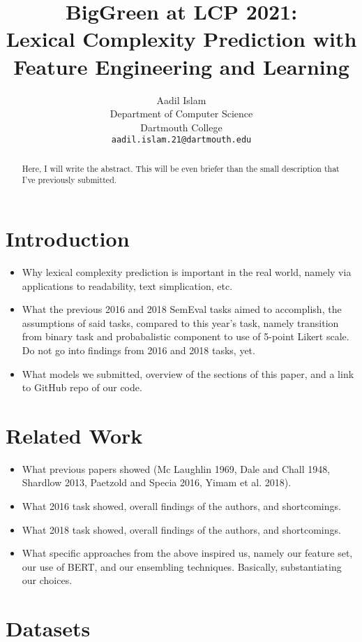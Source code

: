 \documentclass[11pt,a4paper]{article}
\title{BigGreen at LCP 2021: \\
Lexical Complexity Prediction with Feature Engineering and Learning}
\author{
  Aadil Islam\\
  Department of Computer Science\\
  Dartmouth College\\
  \texttt{aadil.islam.21@dartmouth.edu}
}
\date{}
\begin{document}
\maketitle
\begin{abstract}
  Here, I will write the abstract. This will be even briefer than the small description that I've previously submitted.
\end{abstract}

\section{Introduction}

\begin{itemize}
  \item Why lexical complexity prediction is important in the real world, namely via applications to readability, text simplication, etc.
  \item What the previous 2016 and 2018 SemEval tasks aimed to accomplish, the assumptions of said tasks, compared to this year's task, namely transition from binary task and probabalistic component to use of 5-point Likert scale. Do not go into findings from 2016 and 2018 tasks, yet.
  \item What models we submitted, overview of the sections of this paper, and a link to GitHub repo of our code.
\end{itemize}

\section{Related Work}

\begin{itemize}
  \item What previous papers showed (Mc Laughlin 1969, Dale and Chall 1948, Shardlow 2013, Paetzold and Specia 2016, Yimam et al. 2018).
  \item What 2016 task showed, overall findings of the authors, and shortcomings. 
  \item What 2018 task showed, overall findings of the authors, and shortcomings.
  \item What specific approaches from the above inspired us, namely our feature set, our use of BERT, and our ensembling techniques. Basically, substantiating our choices.
\end{itemize}

\section{Datasets}
\end{document}

